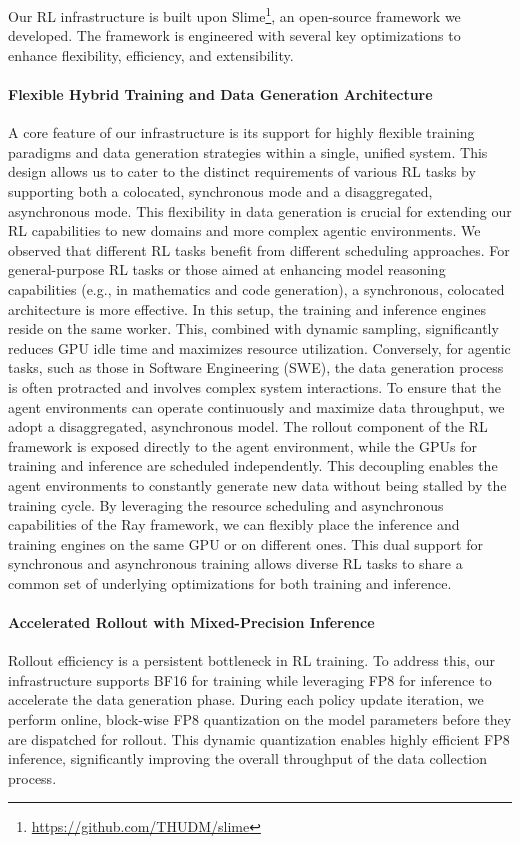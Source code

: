 \documentclass{article}
\theoremstyle{definition}
\begin{document}
Our RL infrastructure is built upon Slime\footnote{\url{https://github.com/THUDM/slime}}, an open-source framework we developed. The framework is engineered with several key optimizations to enhance flexibility, efficiency, and extensibility.

\paragraph{Flexible Hybrid Training and Data Generation Architecture} A core feature of our infrastructure is its support for highly flexible training paradigms and data generation strategies within a single, unified system. This design allows us to cater to the distinct requirements of various RL tasks by supporting both a colocated, synchronous mode and a disaggregated, asynchronous mode. This flexibility in data generation is crucial for extending our RL capabilities to new domains and more complex agentic environments.
We observed that different RL tasks benefit from different scheduling approaches. For general-purpose RL tasks or those aimed at enhancing model reasoning capabilities (e.g., in mathematics and code generation), a synchronous, colocated architecture is more effective. In this setup, the training and inference engines reside on the same worker. This, combined with dynamic sampling, significantly reduces GPU idle time and maximizes resource utilization.
Conversely, for agentic tasks, such as those in Software Engineering (SWE), the data generation process is often protracted and involves complex system interactions. To ensure that the agent environments can operate continuously and maximize data throughput, we adopt a disaggregated, asynchronous model. The rollout component of the RL framework is exposed directly to the agent environment, while the GPUs for training and inference are scheduled independently. This decoupling enables the agent environments to constantly generate new data without being stalled by the training cycle.
By leveraging the resource scheduling and asynchronous capabilities of the Ray framework, we can flexibly place the inference and training engines on the same GPU or on different ones. This dual support for synchronous and asynchronous training allows diverse RL tasks to share a common set of underlying optimizations for both training and inference.

\paragraph{Accelerated Rollout with Mixed-Precision Inference} Rollout efficiency is a persistent bottleneck in RL training. To address this, our infrastructure supports BF16 for training while leveraging FP8 for inference to accelerate the data generation phase.
During each policy update iteration, we perform online, block-wise FP8 quantization on the model parameters before they are dispatched for rollout. This dynamic quantization enables highly efficient FP8 inference, significantly improving the overall throughput of the data collection process.
\end{document}
